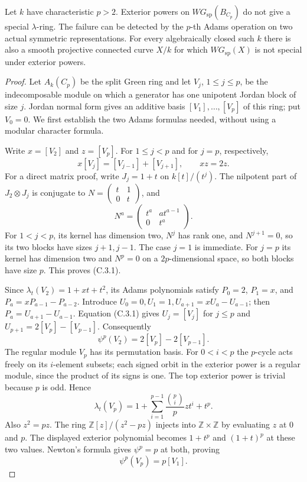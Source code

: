 \begin{theorem}
\label{C:odd_characteristic_failure}
Let $k$ have characteristic $p>2$. Exterior powers on
$WG_{\mathrm{sp}}(B_{C_p})$ do not give a special $\lambda$-ring. The failure
can be detected by the $p$-th Adams operation on two actual symmetric
representations. For every algebraically closed such $k$ there is also a
smooth projective connected curve $X/k$ for which $WG_{\mathrm{sp}}(X)$ is
not special under exterior powers.
\end{theorem}
\begin{proof}
Let $A_k(C_p)$ be the split Green ring and let $V_j$, $1\leq j\leq p$, be
the indecomposable module on which a generator has one unipotent Jordan
block of size $j$. Jordan normal form gives an additive basis
$[V_1],\ldots,[V_p]$ of this ring; put $V_0=0$. We first establish the two
Adams formulas needed, without using a modular character formula.

Write $x=[V_2]$ and $z=[V_p]$. For $1\leq j<p$ and for $j=p$, respectively,
\[
 x[V_j]=[V_{j-1}]+[V_{j+1}],\qquad xz=2z.                 \tag{C.3.1}
\]
For a direct matrix proof, write $J_j=1+t$ on $k[t]/(t^j)$. The nilpotent
part of $J_2\otimes J_j$ is conjugate to
$N=\left(\begin{smallmatrix}t&1\\0&t\end{smallmatrix}\right)$, and
\[
 N^a=\begin{pmatrix}t^a&a t^{a-1}\\0&t^a\end{pmatrix}.
\]
For $1<j<p$, its kernel has dimension two, $N^j$ has rank one, and
$N^{j+1}=0$, so its two blocks have sizes $j+1,j-1$. The case $j=1$ is
immediate. For $j=p$ its kernel has dimension two and $N^p=0$ on a
$2p$-dimensional space, so both blocks have size $p$. This proves (C.3.1).

Since $\lambda_t(V_2)=1+xt+t^2$, its Adams polynomials satisfy
$P_0=2$, $P_1=x$, and $P_a=xP_{a-1}-P_{a-2}$. Introduce
$U_0=0,U_1=1,U_{a+1}=xU_a-U_{a-1}$; then $P_a=U_{a+1}-U_{a-1}$.
Equation (C.3.1) gives $U_j=[V_j]$ for $j\leq p$ and
$U_{p+1}=2[V_p]-[V_{p-1}]$. Consequently
\[
 \psi^p(V_2)=2[V_p]-2[V_{p-1}].                         \tag{C.3.2}
\]
The regular module $V_p$ has its permutation basis. For $0<i<p$ the
$p$-cycle acts freely on its $i$-element subsets; each signed orbit in the
exterior power is a regular module, since the product of its signs is one.
The top exterior power is trivial because $p$ is odd. Hence
\[
 \lambda_t(V_p)=1+\sum_{i=1}^{p-1}\frac{\binom pi}{p}z t^i+t^p.
\]
Also $z^2=pz$. The ring $\mathbb Z[z]/(z^2-pz)$ injects into
$\mathbb Z\times\mathbb Z$ by evaluating $z$ at $0$ and $p$.
The displayed exterior polynomial becomes $1+t^p$ and $(1+t)^p$ at these
two values. Newton's formula gives $\psi^p=p$ at both, proving
\[
 \psi^p(V_p)=p[V_1].                                    \tag{C.3.3}
\]


\end{proof}
